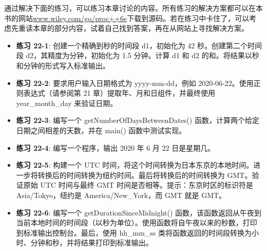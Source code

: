 通过解决下面的练习，可以练习本章讨论的内容。所有练习的解决方案都可以在本书的网站\url{www.wiley.com/go/proc++6e}下载到源码。若在练习中卡住了，可以考虑先重读本章的部分内容，试着自己找到答案，再在从网站上寻找解决方案。

\begin{itemize}
\item
\textbf{练习 22-1}: 创建一个精确到秒的时间段 d1，初始化为 42 秒。创建第二个时间段 d2，其精度为分钟，初始化为 1.5 分钟。计算 d1 和 d2 的和。将结果以秒和分钟的形式写入标准输出。

\item
\textbf{练习 22-2}: 要求用户输入日期格式为 yyyy-mm-dd，例如 2020-06-22。使用正则表达式（请参阅第 21 章）提取年、月和日组件，并最终使用 year\_month\_day 来验证日期。

\item
\textbf{练习 22-3}: 编写一个 getNumberOfDaysBetweenDates() 函数，计算两个给定日期之间相差的天数，并在 main() 函数中测试实现。

\item
\textbf{练习 22-4}: 编写一个程序，输出 2020 年 6 月 22 日是星期几。

\item
\textbf{练习 22-5}: 构建一个 UTC 时间，将这个时间转换为日本东京的本地时间。进一步将转换后的时间转换为纽约时间。最后将转换后的时间转换为 GMT。验证原始 UTC 时间与最终 GMT 时间是否相等。提示：东京时区的标识符是 Asia/Tokyo，纽约是 America/New\_York，而 GMT 就是 GMT。

\item
\textbf{练习 22-6}: 编写一个 getDurationSinceMidnight() 函数，该函数返回从午夜到当前本地时间的时间段（以秒为单位）。使用函数将自午夜以来的秒数，打印到标准输出控制台。最后，使用 hh\_mm\_ss 类将函数返回的时间段转换为小时、分钟和秒，并将结果打印到标准输出。
\end{itemize}











